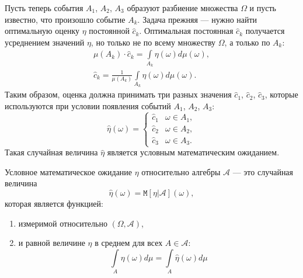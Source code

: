 \documentclass[a4paper,12pt]{article}
\newcommand{\cexpectation}[2]{\texttt{M} \left[ #1 | #2 \right]}
\begin{document}
Пусть теперь события $A_1$, $A_2$, $A_3$ образуют разбиение множества $\Omega$ и пусть известно, что произошло событие $A_k$.
Задача прежняя --- нужно найти оптимальную оценку $\eta$ постоянной $\widehat{c}_k$. Оптимальная постоянная $\widehat{c}_k$
получается усреднением значений $\eta$, но только не по всему множеству $\Omega$, а только по $A_k$:
\begin{gather*}
    \mu(A_k) \cdot \widehat{c}_k = \int \limits_{A_k} \eta(\omega) d \mu(\omega) , \\
    \widehat{c}_k = \frac{1}{\mu(A_k)} \int \limits_{A_k} \eta(\omega) d \mu(\omega) .
\end{gather*}
Таким образом, оценка должна принимать три разных значения $\widehat{c}_1$, $\widehat{c}_2$, $\widehat{c}_3$, которые
используются при условии появления событий $A_1$, $A_2$, $A_3$:
\[
    \widehat{\eta}(\omega)
    = \left \{
    \begin{array}{ll}
        \widehat{c}_1 & \omega \in A_1 , \\
        \widehat{c}_2 & \omega \in A_2 , \\
        \widehat{c}_3 & \omega \in A_3 .
    \end{array}
    \right .
\]
Такая случайная величина $\widehat{\eta}$ является условным математическим ожиданием.

Условное математическое ожидание $\eta$ относительно алгебры $\mathcal{A}$ --- это случайная величина
\[
    \widehat{\eta}(\omega) = \cexpectation{\eta}{\mathcal{A}}(\omega) ,
\]
которая является функцией:
\begin{enumerate}
    \item измеримой относительно $(\Omega, \mathcal{A})$,
    \item и равной величине $\eta$ в среднем для всех $A \in \mathcal{A}$:
          \[
              \int \limits_{A} \eta(\omega) d \mu = \int \limits_{A} \widehat{\eta}(\omega) d \mu
          \]
\end{enumerate}
\end{document}
